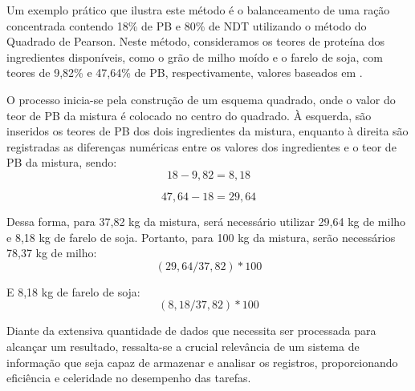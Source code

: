 Um exemplo prático que ilustra este método é o balanceamento de uma ração concentrada contendo 18\% de \gls{PB} e 80\% de \gls{NDT} utilizando o método do Quadrado de Pearson. Neste método, consideramos os teores de proteína dos ingredientes disponíveis, como o grão de milho moído e o farelo de soja, com teores de 9,82\% e 47,64\% de \gls{PB}, respectivamente, valores baseados em .

O processo inicia-se pela construção de um esquema quadrado, onde o valor do teor de \gls{PB} da mistura é colocado no centro do quadrado. À esquerda, são inseridos os teores de \gls{PB} dos dois ingredientes da mistura, enquanto à direita são registradas as diferenças numéricas entre os valores dos ingredientes e o teor de \gls{PB} da mistura, sendo: 
\begin{equation}
  \label{eq:pearson1}
  18 - 9,82 = 8,18
\end{equation}

\begin{equation}
  \label{eq:pearson2}
  47,64 - 18 = 29,64
\end{equation}

Dessa forma, para 37,82 kg da mistura, será necessário utilizar 29,64 kg de milho e 8,18 kg de farelo de soja. Portanto, para 100 kg da mistura, serão necessários 78,37 kg de milho:
\begin{equation}
 \label{eq:pearson3}
 (29,64 / 37,82)*100 
\end{equation}

E 8,18 kg de farelo de soja:
\begin{equation}
 \label{eq:pearson4}
 (8,18 / 37,82)*100
\end{equation}

Diante da extensiva quantidade de dados que necessita ser processada para alcançar um resultado, ressalta-se a crucial relevância de um sistema de informação que seja capaz de armazenar e analisar os registros, proporcionando eficiência e celeridade no desempenho das tarefas.

